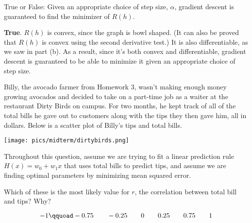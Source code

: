 \documentclass{article}
\begin{document}
\begin{probset}
\begin{prob}
\begin{subprobset}
\begin{subprob}[1 Point]
True or False: Given an appropriate choice of step size, $\alpha$, gradient descent is guaranteed to find the minimizer of $R(h)$.

\begin{soln}
\textbf{True}. $R(h)$ is convex, since the graph is bowl shaped. (It can also be proved that $R(h)$ is convex using the second derivative test.) It is also differentiable, as we saw in part (b). As a result, since it's both convex and differentiable, gradient descent is guaranteed to be able to minimize it given an appropriate choice of step size.
\end{soln}

\vspace{.85in}

\end{subprob}

\end{subprobset}

\end{prob}

\newpage

\begin{prob}

Billy, the avocado farmer from Homework 3, wasn't making enough money growing avocados and decided to take on a part-time job as a waiter at the restaurant Dirty Birds on campus. For two months, he kept track of all of the total bills he gave out to customers along with the tips they then gave him, all in dollars. Below is a scatter plot of Billy's tips and total bills.

\begin{center}
    \texttt{[image: pics/midterm/dirtybirds.png]}
\end{center}

Throughout this question, assume we are trying to fit a linear prediction rule $H(x) = w_0 + w_1x$ that uses total bills to predict tips, and assume we are finding optimal parameters by minimizing mean squared error.

\begin{subprobset}

\begin{subprob}[2 Points]
Which of these is the most likely value for $r$, the correlation between total bill and tips? Why?

\begin{center}
    $$-1 \qquoad -0.75 \qquad -0.25 \qquad 0 \qquad 0.25 \qquad 0.75 \qquad 1$$
\end{center}


\end{subprob}
\end{subprobset}
\end{prob}
\end{probset}
\end{document}
